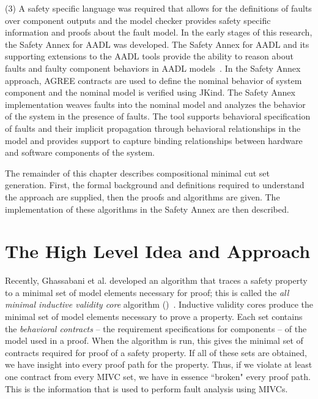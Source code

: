 (3) A safety specific language was required that allows for the definitions of faults over component outputs and the model checker provides safety specific information and proofs about the fault model. In the early stages of this research, the Safety Annex for AADL was developed. The Safety Annex for AADL and its supporting extensions to the AADL tools provide the ability to reason about faults and faulty component behaviors in AADL models~\cite{Stewart17:IMBSA,stewart2020safety, nasaFinalReport}. In the Safety Annex approach, AGREE contracts are used to define the nominal behavior of system component and the nominal model is verified using JKind. The Safety Annex implementation weaves faults into the nominal model and analyzes the behavior of the system in the presence of faults. The tool supports behavioral specification of faults and their implicit propagation through behavioral relationships in the model and provides support to capture binding relationships between hardware and software components of the system. %

The remainder of this chapter describes compositional minimal cut set generation. First, the formal background and definitions required to understand the approach are supplied, then the proofs and algorithms are given. The implementation of these algorithms in the Safety Annex are then described.

\section{The High Level Idea and Approach}
Recently, Ghassabani et al. developed an algorithm that traces a safety property to a minimal set of model elements necessary for proof; this is called the \textit{all minimal inductive validity core} algorithm (\aivcalg)~\cite{GhassabaniGW16,Ghassabani2017EfficientGO,bendik2018online}. Inductive validity cores produce the minimal set of model elements necessary to prove a property. Each set contains the \emph{behavioral contracts} -- the requirement specifications for components -- of the model used in a proof. When the \aivcalg algorithm is run, this gives the minimal set of contracts required for proof of a safety property. If all of these sets are obtained, we have insight into every proof path for the property. Thus, if we violate at least one contract from every MIVC set, we have in essence ``broken" every proof path. This is the information that is used to perform fault analysis using MIVCs.

